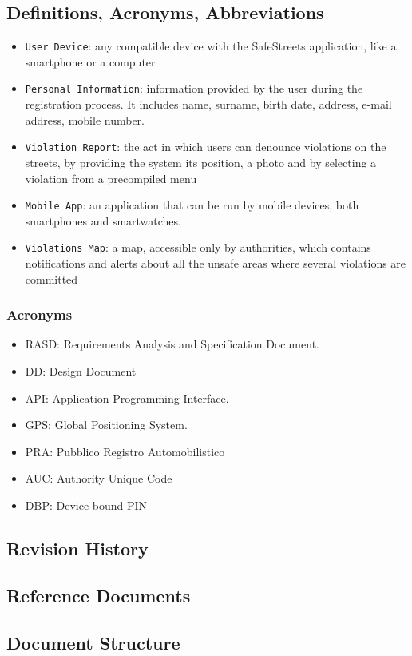 \documentclass[12pt,a4paper]{article}
\begin{document}
\subsection{Definitions, Acronyms, Abbreviations}
			\begin{itemize}
				\item \texttt{User Device}: any compatible device with the SafeStreets application, like a smartphone or a computer
				\item \texttt{Personal Information}: information provided by the user during the registration process. It includes name, surname, birth date, address, e-mail address, mobile number.
				\item \texttt{Violation Report}: the act in which users can denounce violations on the streets, by providing the system its position, a photo and by selecting a violation from a precompiled menu
				\item \texttt{Mobile App}: an application that can be run by mobile devices, both smartphones and smartwatches.
				\item \texttt{Violations Map}: a map, accessible only by authorities, which contains notifications and alerts about all the unsafe areas where several violations are committed
			\end{itemize}
		\subsubsection{Acronyms}
			\begin{itemize}
				\item RASD: Requirements Analysis and Specification Document.
				\item DD: Design Document
				\item API: Application Programming Interface.
				\item GPS: Global Positioning System.
				\item PRA: Pubblico Registro Automobilistico
				\item AUC: Authority Unique Code
				\item DBP: Device-bound PIN
			\end{itemize}
\subsection{Revision History}
\subsection{Reference Documents}
\subsection{Document Structure}
\end{document}
